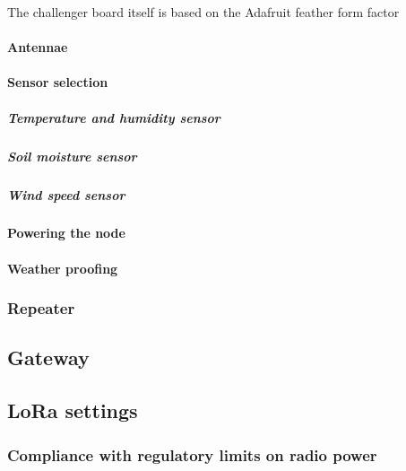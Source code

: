 The challenger board itself is based on the Adafruit feather form factor

\paragraph{Antennae}

\paragraph{Sensor selection}

\subparagraph{Temperature and humidity sensor}

\subparagraph{Soil moisture sensor}

\subparagraph{Wind speed sensor}

\paragraph{Powering the node}

\paragraph{Weather proofing}

\subsubsection{Repeater}

\subsection{Gateway}

\subsection{LoRa settings}

\subsubsection{Compliance with regulatory limits on radio power}